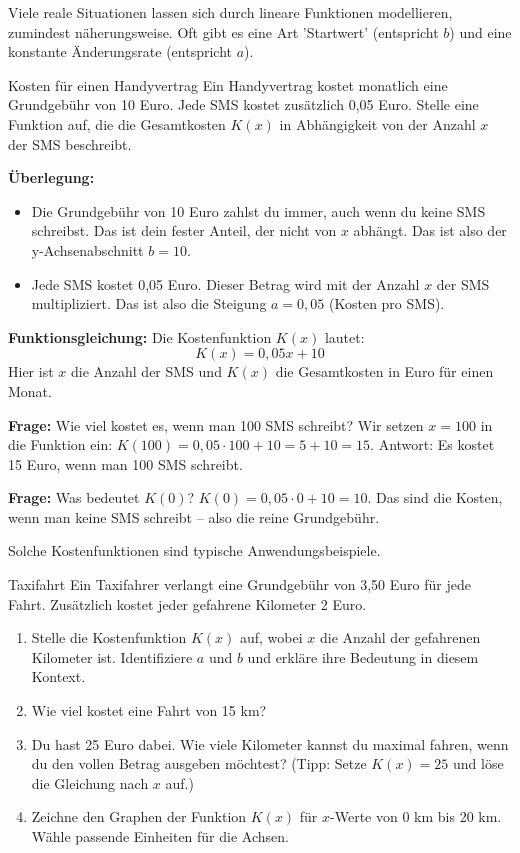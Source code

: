 Viele reale Situationen lassen sich durch lineare Funktionen modellieren, zumindest näherungsweise. Oft gibt es eine Art 'Startwert' (entspricht $b$) und eine konstante Änderungsrate (entspricht $a$).

\begin{beispielumgebung}[Handyvertrag]{Kosten für einen Handyvertrag}
Ein Handyvertrag kostet monatlich eine Grundgebühr von 10 Euro. Jede SMS kostet zusätzlich 0,05 Euro.
Stelle eine Funktion auf, die die Gesamtkosten $K(x)$ in Abhängigkeit von der Anzahl $x$ der SMS beschreibt.

\textbf{Überlegung:}
\begin{itemize}
    \item Die Grundgebühr von 10 Euro zahlst du immer, auch wenn du keine SMS schreibst. Das ist dein fester Anteil, der nicht von $x$ abhängt. Das ist also der y-Achsenabschnitt $b=10$.
    \item Jede SMS kostet 0,05 Euro. Dieser Betrag wird mit der Anzahl $x$ der SMS multipliziert. Das ist also die Steigung $a=0,05$ (Kosten pro SMS).
\end{itemize}
\textbf{Funktionsgleichung:}
Die Kostenfunktion $K(x)$ lautet:
\[ K(x) = 0,05x + 10 \]
Hier ist $x$ die Anzahl der SMS und $K(x)$ die Gesamtkosten in Euro für einen Monat.

\textbf{Frage:} Wie viel kostet es, wenn man 100 SMS schreibt?
Wir setzen $x=100$ in die Funktion ein:
$K(100) = 0,05 \cdot 100 + 10 = 5 + 10 = 15$.
Antwort: Es kostet 15 Euro, wenn man 100 SMS schreibt.

\textbf{Frage:} Was bedeutet $K(0)$?
$K(0) = 0,05 \cdot 0 + 10 = 10$. Das sind die Kosten, wenn man keine SMS schreibt – also die reine Grundgebühr.
\end{beispielumgebung}

Solche Kostenfunktionen sind typische Anwendungsbeispiele.

\begin{aufgabenumgebung}{Taxifahrt}
Ein Taxifahrer verlangt eine Grundgebühr von 3,50 Euro für jede Fahrt. Zusätzlich kostet jeder gefahrene Kilometer 2 Euro.
\begin{enumerate}
    \item Stelle die Kostenfunktion $K(x)$ auf, wobei $x$ die Anzahl der gefahrenen Kilometer ist. Identifiziere $a$ und $b$ und erkläre ihre Bedeutung in diesem Kontext.
    \item Wie viel kostet eine Fahrt von 15 km?
    \item Du hast 25 Euro dabei. Wie viele Kilometer kannst du maximal fahren, wenn du den vollen Betrag ausgeben möchtest? (Tipp: Setze $K(x)=25$ und löse die Gleichung nach $x$ auf.)
    \item Zeichne den Graphen der Funktion $K(x)$ für $x$-Werte von 0 km bis 20 km. Wähle passende Einheiten für die Achsen.
\end{enumerate}
\end{aufgabenumgebung}

